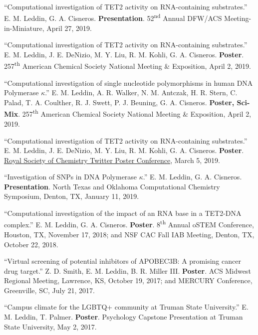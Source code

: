 \documentclass[letterpaper,11pt]{article}
\begin{document}
\begin{etaremune}[start=17]
{  \item \textnormal{``Computational investigation of TET2 activity on RNA-containing substrates.'' E. M. Leddin, G. A. Cisneros. \textbf{Presentation}. 52\textsuperscript{nd} Annual DFW/ACS Meeting-in-Miniature, April 27, 2019.}
  \item \textnormal{``Computational investigation of TET2 activity on RNA-containing substrates.'' E. M. Leddin, J. E. DeNizio, M. Y. Liu, R. M. Kohli, G. A. Cisneros. \textbf{Poster}. 257\textsuperscript{th} American Chemical Society National Meeting \& Exposition, April 2, 2019.}
  \item \textnormal{``Computational investigation of single nucleotide polymorphisms in human DNA Polymerase $\kappa$.'' E. M. Leddin, A. R. Walker, N. M. Antczak, H. R. Stern, C. Palad, T. A. Coulther, R. J. Swett, P. J. Beuning, G. A. Cisneros. \textbf{Poster, Sci-Mix}. 257\textsuperscript{th} American Chemical Society National Meeting \& Exposition, April 2, 2019.}
  \item \textnormal{``Computational investigation of TET2 activity on RNA-containing substrates.'' E. M. Leddin, J. E. DeNizio, M. Y. Liu, R. M. Kohli, G. A. Cisneros. \textbf{Poster}. \href{https://twitter.com/EmLedd1/status/1103107933951459333?s=20}{Royal Society of Chemistry Twitter Poster Conference}, March 5, 2019.}
  \item \textnormal{``Investigation of SNPs in DNA Polymerase $\kappa$.'' E. M. Leddin, G. A. Cisneros. \textbf{Presentation}. North Texas and Oklahoma Computational Chemistry Symposium, Denton, TX, January 11, 2019.}
  \item \textnormal{``Computational investigation of the impact of an RNA base in a TET2-DNA complex.'' E. M. Leddin, G. A. Cisneros. \textbf{Poster}. 8\textsuperscript{th} Annual oSTEM Conference, Houston, TX, November 17, 2018; and NSF CAC Fall IAB Meeting, Denton, TX, October 22, 2018.}
  \item \textnormal{``Virtual screening of potential inhibitors of APOBEC3B: A promising cancer drug target.'' Z. D. Smith, E. M. Leddin, B. R. Miller III. \textbf{Poster}. ACS Midwest Regional Meeting, Lawrence, KS, October 19, 2017; and MERCURY Conference, Greenville, SC, July 21, 2017.}
  \item \textnormal{``Campus climate for the LGBTQ+ community at Truman State University.'' E. M. Leddin, T. Palmer. \textbf{Poster}. Psychology Capstone Presentation at Truman State University, May 2, 2017.}
}
\end{etaremune}
\end{document}
